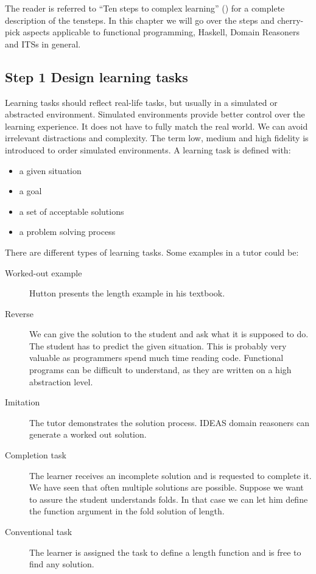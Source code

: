 

The reader is referred to ``Ten steps to complex learning'' (\cite{kirschner_2013}) for a complete description of the \gls{tensteps}.
In this chapter we will go over the steps and cherry-pick aspects applicable to functional programming, Haskell, Domain Reasoners and ITSs in general.

\subsection{Step 1 Design learning tasks}
Learning tasks should reflect real-life tasks, but usually in a simulated or abstracted environment.
Simulated environments provide better control over the learning experience.
It does not have to fully match the real world. We can avoid irrelevant distractions and complexity.
The term low, medium and high fidelity is introduced to order simulated environments.
A learning task is defined with:
\begin{itemize}
\item a given situation
\item a goal
\item a set of acceptable solutions
\item a problem solving process
\end{itemize}
There are different types of learning tasks. Some examples in a tutor could be:

\begin{description}
\item[Worked-out example]  Hutton presents the length example in his textbook.
\item[Reverse] We can give the solution to the student and ask what it is supposed to do. The student has to predict the given situation.
This is probably very valuable as programmers spend much time reading code. 
Functional programs can be difficult to understand, as they are written on a high abstraction level.
\item[Imitation] The tutor demonstrates the solution process. IDEAS domain reasoners can generate a worked out solution.
\item[Completion task] The learner receives an incomplete solution and is requested to complete it. 
We have seen that often multiple solutions are possible. Suppose we want to assure the student understands folds.
In that case we can let him define the function argument in the fold solution of length.
\item[Conventional task] The learner is assigned the task to define a length function and is free to find any solution.
\end{description}

